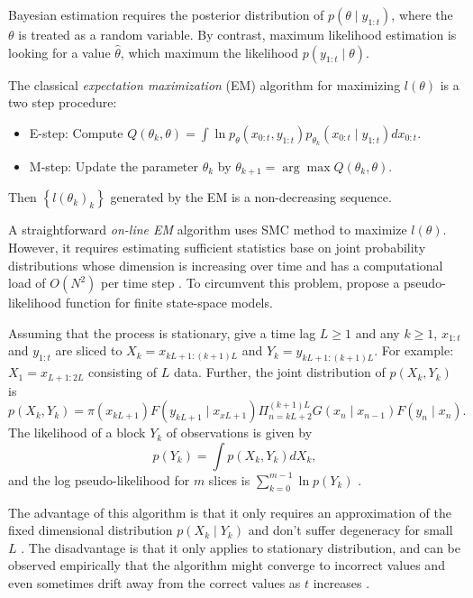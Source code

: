 Bayesian estimation requires the posterior distribution of $p(\theta\mid y_{1:t})$, where the $\theta$ is treated as a random variable. By contrast, maximum likelihood estimation is looking for a value $\hat{\theta}$, which maximum the likelihood $p(y_{1:t}\mid \theta)$. 

The classical \textit{expectation maximization} (EM) algorithm \citep{dempster1977maximum} for maximizing $l(\theta)$ is a two step procedure: 
\begin{itemize}
\item{E-step}:   Compute  $Q(\theta_k,\theta)=\int \ln p_\theta(x_{0:t},y_{1:t})p_{\theta_k}(x_{0:t}\mid y_{1:t}) dx_{0:t}$. 
\item{M-step}: Update the parameter $\theta_k$ by $\theta_{k+1}=\arg \max Q(\theta_k,\theta)$.
\end{itemize}
Then $\left\lbrace l(\theta_k)_k\right\rbrace$ generated by the EM is a non-decreasing sequence.  

A straightforward \textit{on-line EM} algorithm uses SMC method to maximize $l(\theta)$. However, it requires estimating sufficient statistics base on joint probability distributions whose dimension is increasing over time and has a computational load of $\mathit{O}(N^2)$ per time step \citep{kantas2009overview}.  To circumvent this problem, \cite{andrieu2005line} propose a pseudo-likelihood function for finite state-space models. 

Assuming that the process is stationary, give a time lag $L\geq 1$ and any $k\geq 1$, $x_{1:t}$ and $y_{1:t}$ are sliced to $X_k= x_{kL+1:(k+1)L}$ and $Y_k=  y_{kL+1:(k+1)L}$. For example: $X_1= x_{L+1:2L}$ consisting of $L$ data. Further, the joint distribution of $p(X_k,Y_k)$ is 
\begin{equation}
p(X_k,Y_k) = \pi(x_{kL+1})F(y_{kL+1}\mid x_{xL+1})\Pi_{n=kL+2}^{(k+1)L}G(x_n\mid x_{n-1})F(y_n\mid x_n). 
\end{equation}
The likelihood of a block $Y_k$ of observations is given by 
\begin{equation}
p(Y_k) = \int p\left(X_k,Y_k\right)dX_k,
\end{equation}
and the log pseudo-likelihood for $m$ slices is $\sum_{k=0}^{m-1}\ln p(Y_k)$  \citep{andrieu2005line}.


The advantage of this algorithm is that it only requires an approximation of the fixed dimensional distribution $p(X_k\mid Y_k)$ and don't suffer degeneracy for small $L$ \citep{kantas2009overview}. The disadvantage is that it only applies to stationary distribution, and can be observed empirically that the algorithm might converge to incorrect values and even sometimes drift away from the correct values as $t$ increases \citep{andrieu2010particle}.  




